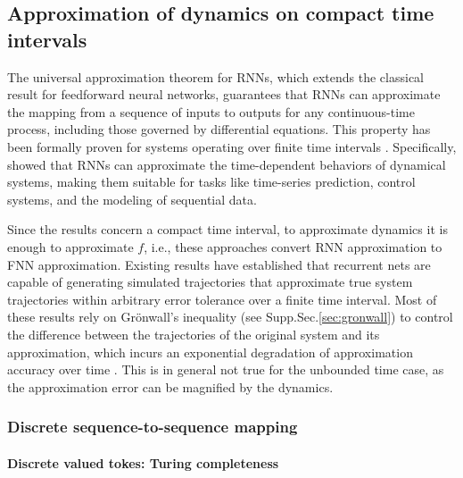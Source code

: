 \documentclass{article}
\theoremstyle{definition}
\theoremstyle{remark}
\newcounter{ct}
\begin{document}
\subsection{Approximation of dynamics on compact time intervals}\label{sec:compacttime}
The universal approximation theorem for RNNs, which extends the classical result for feedforward neural networks, guarantees that RNNs can approximate the mapping from a sequence of inputs to outputs for any continuous-time process, including those governed by differential equations.
%
This property has been formally proven for systems operating over finite time intervals \citep{li1992approximation}. %
Specifically, \citet{funahashi1993approximation} showed that RNNs can approximate the time-dependent behaviors of dynamical systems, making them suitable for tasks like time-series prediction, control systems, and the modeling of sequential data.

Since the results concern a compact time interval, to approximate dynamics it is enough to approximate $f$, i.e., these approaches convert RNN approximation to FNN approximation.
Existing results have established that recurrent nets are capable of generating simulated trajectories that approximate true system trajectories within arbitrary error tolerance over a finite time interval.
Most of these results rely on Gr\"{o}nwall’s inequality (see Supp.Sec.\ref{sec:gronwall}) to control the difference between the trajectories of the original system and its approximation, which incurs an exponential degradation of approximation accuracy over time
\citep{sontag1992neural, sontag1998learning, funahashi1993approximation, chow2000modeling, li2005approximation}.
This is in general not true for the unbounded time case, as the approximation error can be magnified by the dynamics.




\subsubsection{Discrete sequence-to-sequence mapping}\label{sec:discrete}
\paragraph{Discrete valued tokes: Turing completeness}
\end{document}
